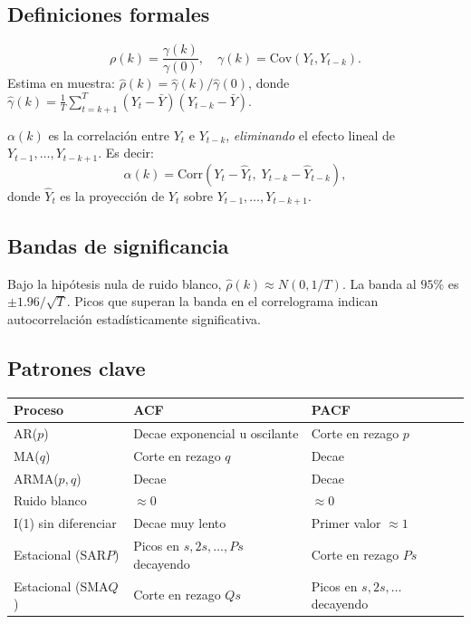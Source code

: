 \documentclass[12pt,a4paper]{article}
\theoremstyle{definition}
\begin{document}
\subsection{Definiciones formales}

\begin{defbox}
\[
  \rho(k) = \frac{\gamma(k)}{\gamma(0)}, \quad
  \gamma(k) = \mathrm{Cov}(Y_t, Y_{t-k}).
\]
Estima en muestra: $\hat{\rho}(k) = \hat{\gamma}(k)/\hat{\gamma}(0)$,
donde $\hat{\gamma}(k) = \frac{1}{T}\sum_{t=k+1}^{T}(Y_t - \bar{Y})(Y_{t-k}-\bar{Y})$.
\end{defbox}

\begin{defbox}
$\alpha(k)$ es la correlación entre $Y_t$ e $Y_{t-k}$, \emph{eliminando}
el efecto lineal de $Y_{t-1}, \ldots, Y_{t-k+1}$. Es decir:
\[
  \alpha(k) = \mathrm{Corr}(Y_t - \hat{Y}_t,\; Y_{t-k} - \hat{Y}_{t-k}),
\]
donde $\hat{Y}_t$ es la proyección de $Y_t$ sobre $Y_{t-1},\ldots,Y_{t-k+1}$.
\end{defbox}

\subsection{Bandas de significancia}

Bajo la hipótesis nula de ruido blanco, $\hat{\rho}(k) \approx N(0, 1/T)$.
La banda al $95\%$ es $\pm 1.96/\sqrt{T}$. Picos que superan la banda en el
correlograma indican autocorrelación estadísticamente significativa.

\subsection{Patrones clave}

\begin{center}
\renewcommand{\arraystretch}{1.3}
\begin{tabular}{p{2.8cm}p{4.5cm}p{4.5cm}}
\toprule
\textbf{Proceso} & \textbf{ACF} & \textbf{PACF} \\
\midrule
AR($p$) & Decae exponencial u oscilante & Corte en rezago $p$ \\
MA($q$) & Corte en rezago $q$ & Decae \\
ARMA($p,q$) & Decae & Decae \\
Ruido blanco & $\approx 0$ & $\approx 0$ \\
I(1) sin diferenciar & Decae muy lento & Primer valor $\approx 1$ \\
Estacional (SAR$P$) & Picos en $s, 2s, \ldots, Ps$ decayendo & Corte en rezago $Ps$ \\
Estacional (SMA$Q$) & Corte en rezago $Qs$ & Picos en $s,2s,\ldots$ decayendo \\
\bottomrule
\end{tabular}
\end{center}
\end{document}
